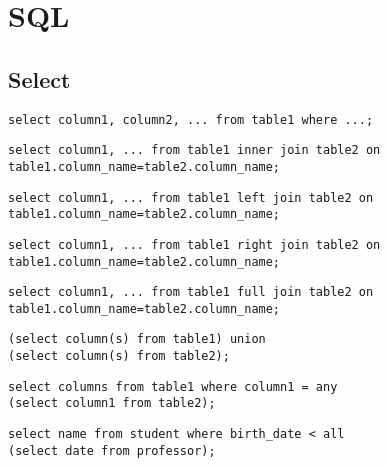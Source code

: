 \section{SQL}

\subsection{Select}

\lstset{language=SQL}

\begin{lstlisting}[caption=select example]
select column1, column2, ... from table1 where ...; 
\end{lstlisting}

\begin{lstlisting}[caption=inner join example]
select column1, ... from table1 inner join table2 on table1.column_name=table2.column_name;
\end{lstlisting}

\begin{lstlisting}[caption=left join example]
select column1, ... from table1 left join table2 on table1.column_name=table2.column_name;
\end{lstlisting}

\begin{lstlisting}[caption=right join example]
select column1, ... from table1 right join table2 on table1.column_name=table2.column_name;
\end{lstlisting}

\begin{lstlisting}[caption=full join example]
select column1, ... from table1 full join table2 on table1.column_name=table2.column_name;
\end{lstlisting}

\begin{lstlisting}[caption=union example]
(select column(s) from table1) union 
(select column(s) from table2);
\end{lstlisting}

\begin{lstlisting}[caption=any example]
select columns from table1 where column1 = any 
(select column1 from table2);
\end{lstlisting}

\begin{lstlisting}[caption=all example]
select name from student where birth_date < all 
(select date from professor);
\end{lstlisting}

